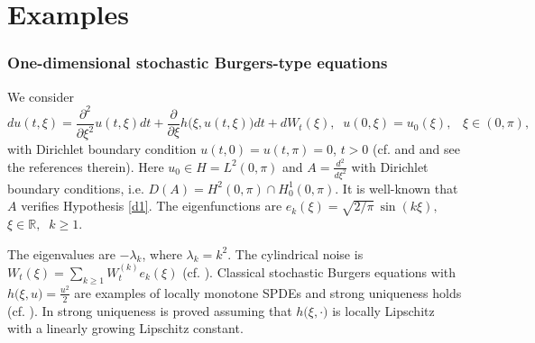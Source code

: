 \documentclass[preprint]{imsart}
\newtheorem{remark}[theorem]{Remark}
\def\R{\mathbb R}
\begin{document}
 
 
 \section{Examples}  
\subsubsection{  One-dimensional  stochastic Burgers-type equations      
}   We consider 
  \begin{equation} \label{bur0}
d u (t, \xi)=   \frac{\partial^2}{\partial   \xi^2}  u(t, \xi)dt  +   \frac{\partial }{\partial \xi} {   h( }\xi, u(t, \xi))dt + dW_t(\xi), \;\; u(0, \xi) = u_0(\xi), \;\;\; \xi \in (0,\pi),
 \end{equation}
 with Dirichlet boundary condition $u(t,0) = u(t,\pi)=0$, $t>0$ (cf. \cite{Gy} and \cite{D2} and see the references therein). Here $u_0 \in H = L^2(0,\pi)$ and $A = \frac{d^2}{d  \xi^2}$ with Dirichlet boundary conditions, i.e. $D(A) = H^2(0, \pi) \cap H^1_0 (0, \pi)$. It is well-known that $A$ verifies Hypothesis \ref{d1}. The
eigenfunctions are
 $
 e_k (\xi) = \sqrt{2/\pi} \,  \sin (k \xi), $ $ \xi \in \R,\;\; k \ge 1.
 $
 
 The  eigenvalues
 are $-\lambda_k$, where $\lambda_k = k^2 $. 
  The cylindrical noise is $W_t(\xi) = \sum_{k \ge 1 }  
   W_t^{(k)} e_k(\xi)$ (cf. \cite{DZ}).
   {  Classical stochastic Burgers equations with ${   h( }\xi, u) = \frac{u^2}{2}$ are examples of locally monotone SPDEs and strong uniqueness holds (cf. \cite{brezniak}).}
   In \cite{Gy} {  strong uniqueness  is proved}
  assuming that ${   h( }\xi, \cdot )$ is locally Lipschitz with a linearly growing Lipschitz constant.  
  
\end{document}

